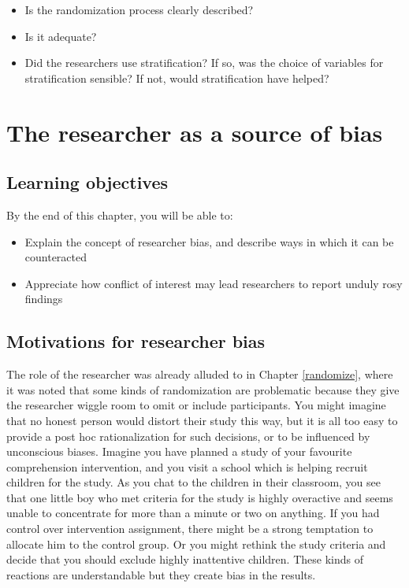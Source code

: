 \documentclass{krantz}
\begin{document}
\begin{itemize}
\item
  Is the randomization process clearly described?
\item
  Is it adequate?
\item
  Did the researchers use stratification? If so, was the choice of variables for stratification sensible? If not, would stratification have helped?
\end{itemize}

\hypertarget{experimenter}{%
\chapter{The researcher as a source of bias}\label{experimenter}}

\hypertarget{learning-objectives-7}{%
\section{Learning objectives}\label{learning-objectives-7}}

By the end of this chapter, you will be able to:

\begin{itemize}
\item
  Explain the concept of researcher bias, and describe ways in which it can be counteracted
\item
  Appreciate how conflict of interest may lead researchers to report unduly rosy findings
\end{itemize}

\hypertarget{motivations-for-researcher-bias}{%
\section{Motivations for researcher bias}\label{motivations-for-researcher-bias}}

The role of the researcher was already alluded to in Chapter \ref{randomize}, where it was noted that some kinds of randomization are problematic because they give the researcher wiggle room to omit or include participants. You might imagine that no honest person would distort their study this way, but it is all too easy to provide a post hoc rationalization for such decisions, or to be influenced by unconscious biases. Imagine you have planned a study of your favourite comprehension intervention, and you visit a school which is helping recruit children for the study. As you chat to the children in their classroom, you see that one little boy who met criteria for the study is highly overactive and seems unable to concentrate for more than a minute or two on anything. If you had control over intervention assignment, there might be a strong temptation to allocate him to the control group. Or you might rethink the study criteria and decide that you should exclude highly inattentive children. These kinds of reactions are understandable but they create bias in the results.
\end{document}
